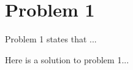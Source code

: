 \documentclass[../hwk01.tex]{subfile}
\begin{document}
\section*{Problem 1}\label{prob:1}
Problem 1 states that ... 
\begin{solution}
Here is a solution to problem 1... 
\end{solution}
\end{document}
